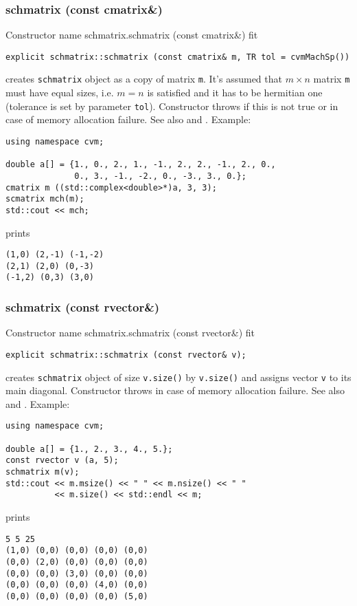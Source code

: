 \subsubsection{schmatrix (const cmatrix\&)}
Constructor%
\pdfdest name {schmatrix.schmatrix (const cmatrix&)} fit
\begin{verbatim}
explicit schmatrix::schmatrix (const cmatrix& m, TR tol = cvmMachSp())
\end{verbatim}
creates  \verb"schmatrix" object as a copy of matrix \verb"m".
It's assumed that $m\times n$ matrix \verb"m" must have equal
sizes, i.e. $m = n$ is satisfied and it has to be  hermitian one
(tolerance is set by parameter \verb'tol').
Constructor throws  
if this is not true or in case of memory allocation failure.
See also  and .
Example:
\begin{Verbatim}
using namespace cvm;

double a[] = {1., 0., 2., 1., -1., 2., 2., -1., 2., 0.,
              0., 3., -1., -2., 0., -3., 3., 0.};
cmatrix m ((std::complex<double>*)a, 3, 3);
scmatrix mch(m);
std::cout << mch;
\end{Verbatim}
prints
\begin{Verbatim}
(1,0) (2,-1) (-1,-2)
(2,1) (2,0) (0,-3)
(-1,2) (0,3) (3,0)
\end{Verbatim}
\newpage




\subsubsection{schmatrix (const rvector\&)}
Constructor%
\pdfdest name {schmatrix.schmatrix (const rvector&)} fit
\begin{verbatim}
explicit schmatrix::schmatrix (const rvector& v);
\end{verbatim}
creates  \verb"schmatrix" object
of size \verb"v.size()" by \verb"v.size()"
and assigns vector \verb"v" to its main diagonal.
Constructor throws  
in case of memory allocation failure.
See also  and .
Example:
\begin{Verbatim}
using namespace cvm;

double a[] = {1., 2., 3., 4., 5.};
const rvector v (a, 5);
schmatrix m(v);
std::cout << m.msize() << " " << m.nsize() << " " 
          << m.size() << std::endl << m;
\end{Verbatim}
prints
\begin{Verbatim}
5 5 25
(1,0) (0,0) (0,0) (0,0) (0,0)
(0,0) (2,0) (0,0) (0,0) (0,0)
(0,0) (0,0) (3,0) (0,0) (0,0)
(0,0) (0,0) (0,0) (4,0) (0,0)
(0,0) (0,0) (0,0) (0,0) (5,0)
\end{Verbatim}
\newpage



